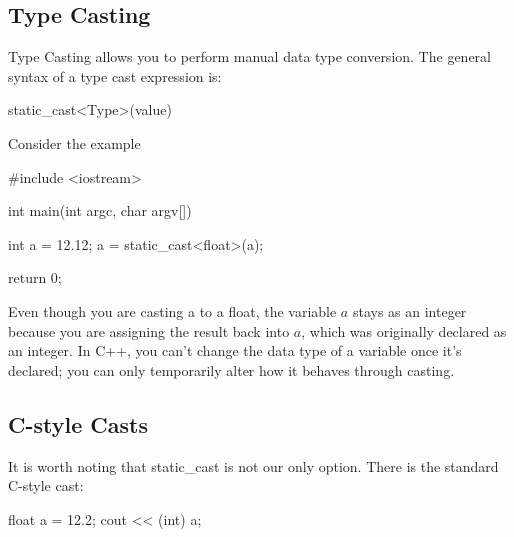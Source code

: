 \documentclass{report}
\begin{document}
    \bigbreak \noindent 
    \subsection{Type Casting}
    \bigbreak \noindent 
    \begin{concept}
 Type Casting allows you to perform manual data type conversion. The general syntax of a type cast expression is:
	\end{concept}
    \bigbreak \noindent 
    
    \begin{cppcode}
static_cast<Type>(value)
    \end{cppcode}
    
    \bigbreak \noindent 
    Consider the example
    \smallbreak \noindent
    
    \begin{cppcode}
#include <iostream>

int main(int argc, char argv[]){
    int a = 12.12;
    a = static_cast<float>(a);

    return 0;
}
    \end{cppcode}
    
    \bigbreak \noindent 
    Even though you are casting a to a float, the variable $a$ stays as an integer because you are assigning the result back into $a$, which was originally declared as an integer. In C++, you can't change the data type of a variable once it's declared; you can only temporarily alter how it behaves through casting.

    \bigbreak \noindent 
    \subsection{C-style Casts}
    \bigbreak \noindent 
    It is worth noting that static\_cast is not our only option. There is the standard C-style cast:
    \bigbreak \noindent 
    
    \begin{cppcode}
float a = 12.2;
cout << (int) a;
    \end{cppcode}
    
    
\end{document}
